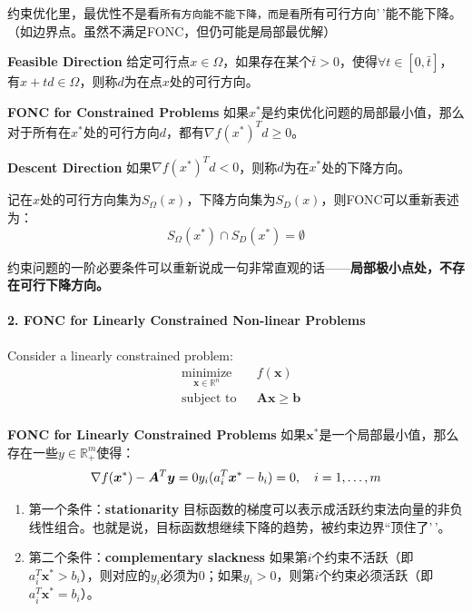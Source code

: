 \documentclass[11pt,a4paper]{article}
\providecommand{\tightlist}{\setlength{\itemsep}{0pt}\setlength{\parskip}{0pt}}
\begin{document}
约束优化里，最优性不是看\texttt{所有方向\textquotesingle{}\textquotesingle{}能不能下降，而是看}所有可行方向'\,'能不能下降。（如边界点。虽然不满足FONC，但仍可能是局部最优解）

\textbf{Feasible Direction} 给定可行点\(x \in \Omega\)，如果存在某个\(\bar{t} > 0\)，使得\(\forall t \in [0, \bar{t}]\)，有\(x + t d \in \Omega\)，则称\(d\)为在点\(x\)处的可行方向。

\textbf{FONC for Constrained Problems} 如果\(x^*\)是约束优化问题的局部最小值，那么对于所有在\(x^*\)处的可行方向\(d\)，都有\(\nabla f(x^*)^T d \geq 0\)。

\textbf{Descent Direction} 如果\(\nabla f(x^*)^T d < 0\)，则称\(d\)为在\(x^*\)处的下降方向。

记在\(x\)处的可行方向集为\(S_{\Omega}(x)\)，下降方向集为\(S_{D}(x)\)，则FONC可以重新表述为： \[S_{\Omega}(x^*) \cap S_{D}(x^*) = \emptyset\]

约束问题的一阶必要条件可以重新说成一句非常直观的话------\textbf{局部极小点处，不存在可行下降方向。}

\paragraph{2. FONC for Linearly Constrained Non-linear Problems}\label{fonc-for-linearly-constrained-non-linear-problems}

Consider a linearly constrained problem: \[\begin{aligned}
& \underset{\boldsymbol{x} \in \mathbb{R}^n}{\text{minimize}} & & f(\boldsymbol{x}) \\
& \text{subject to} & & \boldsymbol{A x} \geq \boldsymbol{b} \\
\end{aligned}\]

\textbf{FONC for Linearly Constrained Problems} 如果\(\boldsymbol{x}^*\)是一个局部最小值，那么存在一些\(y \in \mathbb{R}^m_+\)使得： \[\nabla f(\boldsymbol{x}^*) - \boldsymbol{A}^T \boldsymbol{y} = 0\\
y_i (a_i^T \boldsymbol{x}^* - b_i) = 0, \quad i = 1, \ldots, m\]

\begin{enumerate}
\def\labelenumi{\arabic{enumi}.}
\tightlist
\item
  第一个条件：\textbf{stationarity} 目标函数的梯度可以表示成活跃约束法向量的非负线性组合。也就是说，目标函数想继续下降的趋势，被约束边界``顶住了'\,'。
\item
  第二个条件：\textbf{complementary slackness} 如果第\(i\)个约束不活跃（即\(a_i^T \boldsymbol{x}^* > b_i\)），则对应的\(y_i\)必须为0；如果\(y_i > 0\)，则第\(i\)个约束必须活跃（即\(a_i^T \boldsymbol{x}^* = b_i\)）。
\end{enumerate}
\end{document}
